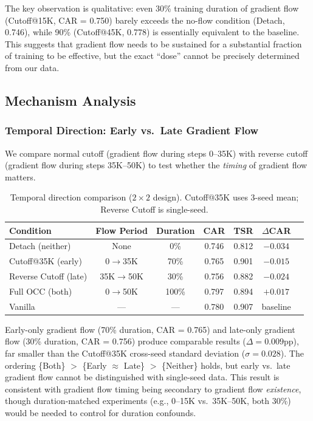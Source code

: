 \documentclass[10pt,letterpaper]{article}
\begin{document}
The key observation is qualitative: even 30\% training duration of gradient flow (Cutoff@15K, CAR = 0.750) barely exceeds the no-flow condition (Detach, 0.746), while 90\% (Cutoff@45K, 0.778) is essentially equivalent to the baseline. This suggests that gradient flow needs to be sustained for a substantial fraction of training to be effective, but the exact ``dose'' cannot be precisely determined from our data.

\subsection{Mechanism Analysis}
\label{sec:mechanism}

\subsubsection{Temporal Direction: Early vs.\ Late Gradient Flow}
\label{sec:reverse}

We compare normal cutoff (gradient flow during steps 0--35K) with reverse cutoff (gradient flow during steps 35K--50K) to test whether the \emph{timing} of gradient flow matters.

\begin{table}[t]
\centering
\caption{Temporal direction comparison ($2 \times 2$ design). Cutoff@35K uses 3-seed mean; Reverse Cutoff is single-seed.}
\label{tab:temporal}
\begin{tabular}{lcccccc}
\toprule
Condition & Flow Period & Duration & CAR & TSR & $\Delta$CAR \\
\midrule
Detach (neither)         & None        & 0\%  & 0.746 & 0.812 & $-0.034$ \\
Cutoff@35K (early)       & 0$\to$35K   & 70\% & 0.765 & 0.901 & $-0.015$ \\
Reverse Cutoff (late)    & 35K$\to$50K & 30\% & 0.756 & 0.882 & $-0.024$ \\
Full OCC (both)          & 0$\to$50K   & 100\%& 0.797 & 0.894 & $+0.017$ \\
Vanilla                  & ---         & ---  & 0.780 & 0.907 & baseline \\
\bottomrule
\end{tabular}
\end{table}

Early-only gradient flow (70\% duration, CAR = 0.765) and late-only gradient flow (30\% duration, CAR = 0.756) produce comparable results ($\Delta = 0.009$pp), far smaller than the Cutoff@35K cross-seed standard deviation ($\sigma = 0.028$). The ordering \{Both\} $>$ \{Early $\approx$ Late\} $>$ \{Neither\} holds, but early vs.\ late gradient flow cannot be distinguished with single-seed data. This result is consistent with gradient flow timing being secondary to gradient flow \emph{existence}, though duration-matched experiments (e.g., 0--15K vs.\ 35K--50K, both 30\%) would be needed to control for duration confounds.
\end{document}
